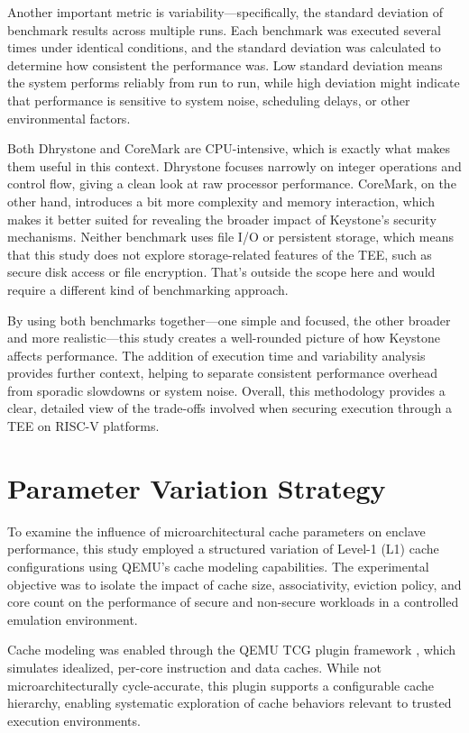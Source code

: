 Another important metric is variability—specifically, the standard deviation of benchmark results across multiple runs. Each benchmark was executed several times under identical conditions, and the standard deviation was calculated to determine how consistent the performance was. Low standard deviation means the system performs reliably from run to run, while high deviation might indicate that performance is sensitive to system noise, scheduling delays, or other environmental factors.

Both Dhrystone and CoreMark are CPU-intensive, which is exactly what makes them useful in this context. Dhrystone focuses narrowly on integer operations and control flow, giving a clean look at raw processor performance. CoreMark, on the other hand, introduces a bit more complexity and memory interaction, which makes it better suited for revealing the broader impact of Keystone’s security mechanisms. Neither benchmark uses file I/O or persistent storage, which means that this study does not explore storage-related features of the TEE, such as secure disk access or file encryption. That’s outside the scope here and would require a different kind of benchmarking approach.

By using both benchmarks together—one simple and focused, the other broader and more realistic—this study creates a well-rounded picture of how Keystone affects performance. The addition of execution time and variability analysis provides further context, helping to separate consistent performance overhead from sporadic slowdowns or system noise. Overall, this methodology provides a clear, detailed view of the trade-offs involved when securing execution through a TEE on RISC-V platforms.

\section{Parameter Variation Strategy}
\label{sec:param-variation}

To examine the influence of microarchitectural cache parameters on enclave performance, this study employed a structured variation of Level-1 (L1) cache configurations using QEMU's cache modeling capabilities. The experimental objective was to isolate the impact of cache size, associativity, eviction policy, and core count on the performance of secure and non-secure workloads in a controlled emulation environment.

Cache modeling was enabled through the QEMU TCG plugin framework \cite{mandour2021cache}, which simulates idealized, per-core instruction and data caches. While not microarchitecturally cycle-accurate, this plugin supports a configurable cache hierarchy, enabling systematic exploration of cache behaviors relevant to trusted execution environments.

